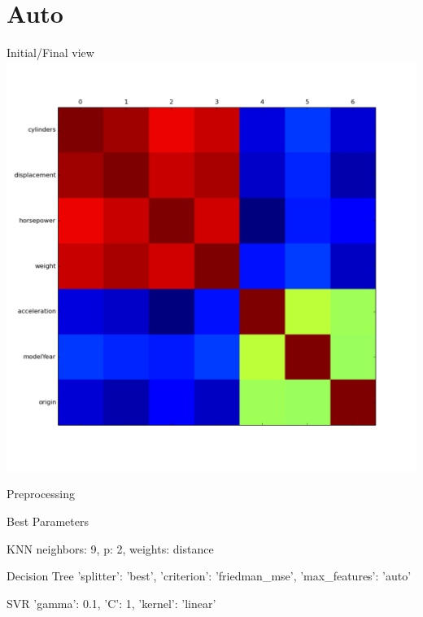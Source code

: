 \documentclass[12pt]{beamer}
\begin{document}
\section{Auto}
\begin{frame}{Initial/Final view}
\includegraphics[height=\textheight,width=\textwidth,keepaspectratio]{plots/auto_final.png}
\end{frame}

\begin{frame}{Preprocessing}

\end{frame}

\begin{frame}{Best Parameters}
\begin{block}{KNN}
neighbors: 9, p: 2, weights: distance
\end{block}

\begin{block}{Decision Tree}
'splitter': 'best', 'criterion': 'friedman\_mse', 'max\_features': 'auto'
\end{block}

\begin{block}{SVR}
'gamma': 0.1, 'C': 1, 'kernel': 'linear'
\end{block}
\end{frame}
\end{document}
